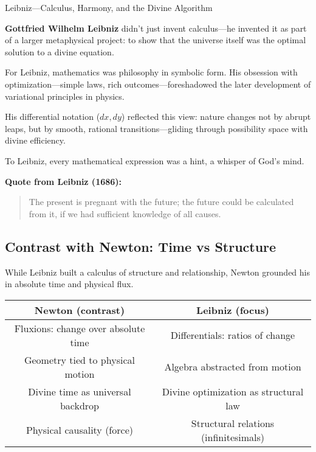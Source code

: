 \begin{HistoricalSidebar}{Leibniz—Calculus, Harmony, and the Divine Algorithm}
  
  \textbf{Gottfried Wilhelm Leibniz} didn’t just invent calculus—he invented it as part of a larger metaphysical project: to show that the universe itself was the optimal solution to a divine equation.

  For Leibniz, mathematics was philosophy in symbolic form.  
  His obsession with optimization—simple laws, rich outcomes—foreshadowed the later development of variational principles in physics.

  \medskip

  His differential notation (\( dx, dy \)) reflected this view: nature changes not by abrupt leaps, but by smooth, rational transitions—gliding through possibility space with divine efficiency.

  \medskip

  To Leibniz, every mathematical expression was a hint, a whisper of God's mind.

  \medskip

  \textbf{Quote from Leibniz (1686):}
  \begin{quote}
  The present is pregnant with the future; the future could be calculated from it, if we had sufficient knowledge of all causes.
  \end{quote}
  
\end{HistoricalSidebar}

\subsection{Contrast with Newton: Time vs Structure}

While Leibniz built a calculus of structure and relationship, Newton grounded his in absolute time and physical flux.

\begin{center}
\begin{tabular}{c|c}
\textbf{Newton (contrast)} & \textbf{Leibniz (focus)} \\
\hline
Fluxions: change over absolute time & Differentials: ratios of change \\
Geometry tied to physical motion & Algebra abstracted from motion \\
Divine time as universal backdrop & Divine optimization as structural law \\
Physical causality (force) & Structural relations (infinitesimals) \\
\end{tabular}
\end{center}

